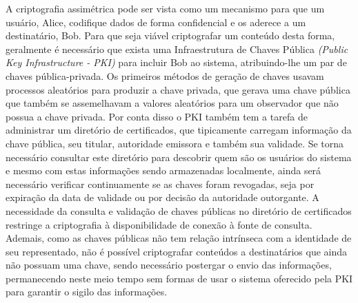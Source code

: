 \documentclass[a4paper,11pt]{article}
\begin{document}
A criptografia assimétrica pode ser vista como um mecanismo para que um usuário, Alice, codifique dados de forma confidencial e os aderece a um destinatário, Bob.
Para que seja viável criptografar um conteúdo desta forma, geralmente é necessário que exista uma Infraestrutura de Chaves Pública \emph{(Public Key Infrastructure - PKI)} para incluir Bob ao sistema, atribuindo-lhe um par de chaves pública-privada.
Os primeiros métodos de geração de chaves usavam processos aleatórios para produzir a chave privada, que gerava uma chave pública que também se assemelhavam a valores aleatórios para um observador que não possua a chave privada.
Por conta disso o PKI também tem a tarefa de administrar um diretório de certificados, que tipicamente carregam informação da chave pública, seu titular, autoridade emissora e também sua validade.
Se torna necessário consultar este diretório para descobrir quem são os usuários do sistema e mesmo com estas informações sendo armazenadas localmente, ainda será necessário verificar continuamente se as chaves foram revogadas, seja por expiração da data de validade ou por decisão da autoridade outorgante.
A necessidade da consulta e validação de chaves públicas no diretório de certificados restringe a criptografia à disponibilidade de conexão à fonte de consulta.
Ademais, como as chaves públicas não tem relação intrínseca com a identidade de seu representado, não é possível criptografar conteúdos a destinatários que ainda não possuam uma chave, sendo necessário postergar o envio das informações, permanecendo neste meio tempo sem formas de usar o sistema oferecido pela PKI para garantir o sigilo das informações.
\end{document}
